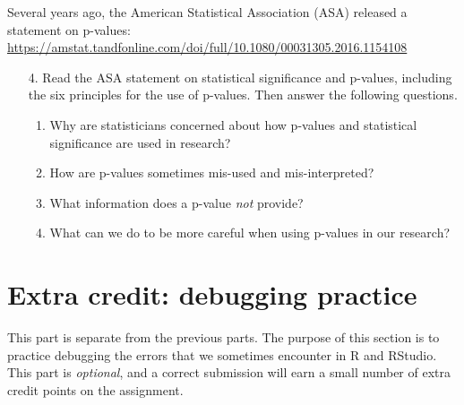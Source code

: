 \documentclass[11pt]{article}
\begin{document}
\noindent Several years ago, the American Statistical Association (ASA) released a statement on p-values:\\

\url{https://amstat.tandfonline.com/doi/full/10.1080/00031305.2016.1154108}

\begin{enumerate}
\item[4.] Read the ASA statement on statistical significance and p-values, including the six principles for the use of p-values. Then answer the following questions.
\begin{enumerate}
\item Why are statisticians concerned about how p-values and statistical significance are used in research?

\item How are p-values sometimes mis-used and mis-interpreted?

\item What information does a p-value \textit{not} provide?

\item What can we do to be more careful when using p-values in our research?
\end{enumerate}
\end{enumerate}

\vspace{1cm}

\section{Extra credit: debugging practice}

This part is separate from the previous parts. The purpose of this section is to practice debugging the errors that we sometimes encounter in R and RStudio. This part is \textit{optional}, and a correct submission will earn a small number of extra credit points on the assignment.
\end{document}
